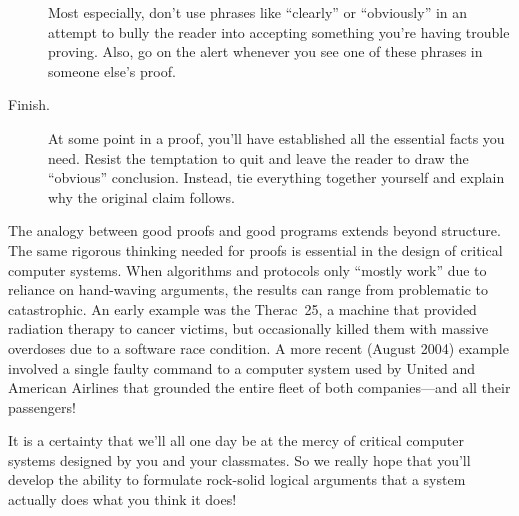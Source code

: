 \begin{description}
  Most especially, don't use phrases like ``clearly'' or ``obviously'' in
  an attempt to bully the reader into accepting something you're having
  trouble proving.  Also, go on the alert whenever you see one of these
  phrases in someone else's proof.

\item[Finish.]  At some point in a proof, you'll have established all the
essential facts you need.  Resist the temptation to quit and leave the
reader to draw the ``obvious'' conclusion.  Instead, tie everything
together yourself and explain why the original claim follows.

\end{description}

The analogy between good proofs and good programs extends beyond
structure.  The same rigorous thinking needed for proofs is essential in
the design of critical computer systems.  When algorithms and protocols
only ``mostly work'' due to reliance on hand-waving arguments, the results
can range from problematic to catastrophic.  An early example was the
Therac~25, a machine that provided radiation therapy to cancer victims,
but occasionally killed them with massive overdoses due to a software race
condition.  A more recent (August 2004) example involved a single faulty
command to a computer system used by United and American Airlines that
grounded the entire fleet of both companies---and all their passengers!

It is a certainty that we'll all one day be at the mercy of critical
computer systems designed by you and your classmates.  So we really
hope that you'll develop the ability to formulate rock-solid logical
arguments that a system actually does what you think it does!

\begin{problems}
\classproblems
{}

\homeworkproblems
{}
\end{problems}

\endinput
